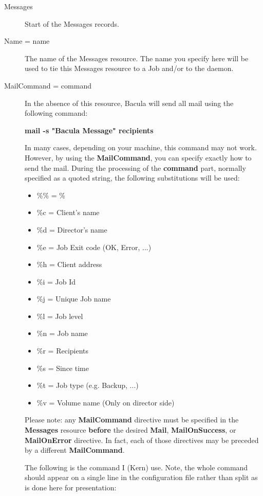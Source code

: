 \begin{description}

\item [Messages]
   Start of the Messages records.  

\item [Name = \lt{}name\gt{}]
   The name of the Messages resource.  The name you specify here will be used to
   tie this Messages  resource to a Job and/or to the daemon.  

\label{mailcommand}
\item [MailCommand = \lt{}command\gt{}]
   In the absence of this resource,  Bacula will send all mail using the
   following command:  

{\bf mail -s "Bacula Message" \lt{}recipients\gt{}}  

In many cases, depending on your machine, this command may not work.  
However, by using the {\bf MailCommand}, you can specify exactly how to
send the mail.  During the processing of the {\bf command} part, normally
specified as a quoted string, the following substitutions will be used:

\begin{itemize}
\item \%\% = \%  
\item \%c = Client's name  
\item \%d = Director's name  
\item \%e = Job Exit code (OK, Error, ...)  
\item \%h = Client address
\item \%i = Job Id  
\item \%j = Unique Job name  
\item \%l = Job level  
\item \%n = Job name  
\item \%r = Recipients  
\item \%s = Since time
\item \%t = Job type (e.g. Backup, ...)  
\item \%v = Volume name (Only on director side)
\end{itemize}

Please note: any {\bf MailCommand} directive must be specified 
in the {\bf Messages} resource {\bf before} the desired
{\bf Mail}, {\bf MailOnSuccess}, or {\bf MailOnError}
directive. In fact, each of those directives may be preceded by
a different {\bf MailCommand}.

The following is the command I (Kern) use. Note, the whole  command should
appear on a single line in the configuration file  rather than split as is
done here for presentation:  


\end{description}
